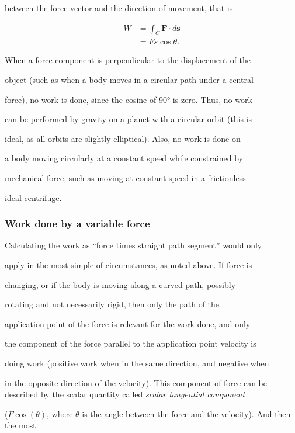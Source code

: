 between the force vector and the direction of movement, that is


\begin{align}
W &= \int_C \mathbf{F} \cdot d\mathbf{s} \\&= Fs\cos\theta.
\end{align}


When a force component is perpendicular to the displacement of the

object (such as when a body moves in a circular path under a central

force), no work is done, since the cosine of 90° is zero. Thus, no work

can be performed by gravity on a planet with a circular orbit (this is

ideal, as all orbits are slightly elliptical). Also, no work is done on

a body moving circularly at a constant speed while constrained by

mechanical force, such as moving at constant speed in a frictionless

ideal centrifuge.


\subsubsection{Work done by a variable force}
\label{sss:work-2473}


Calculating the work as ``force times straight path segment'' would only

apply in the most simple of circumstances, as noted above. If force is

changing, or if the body is moving along a curved path, possibly

rotating and not necessarily rigid, then only the path of the

application point of the force is relevant for the work done, and only

the component of the force parallel to the application point velocity is

doing work (positive work when in the same direction, and negative when

in the opposite direction of the velocity). This component of force can be described by the scalar quantity called \textit{scalar tangential component}

($F \cos (\theta)$, where $\theta$ is the angle between the force and the velocity). And then the most

